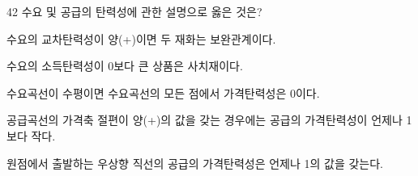 \begin{question}{42}
수요 및 공급의 탄력성에 관한 설명으로 옳은 것은?
\begin{choices}
  \item 수요의 교차탄력성이 양(+)이면 두 재화는 보완관계이다.
  \item 수요의 소득탄력성이 0보다 큰 상품은 사치재이다.
  \item 수요곡선이 수평이면 수요곡선의 모든 점에서 가격탄력성은 0이다.
  \item 공급곡선의 가격축 절편이 양(+)의 값을 갖는 경우에는 공급의 가격탄력성이 언제나 1보다 작다.
  \item 원점에서 출발하는 우상향 직선의 공급의 가격탄력성은 언제나 1의 값을 갖는다.
\end{choices}
\end{question}
